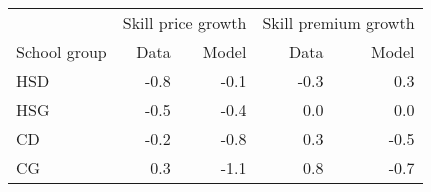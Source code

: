 \begin{tabular}{l|rr|rr}
\hline
 & \multicolumn{2}{|c|}{Skill price growth}  &  \multicolumn{2}{|c}{Skill premium growth} \\ 
School group & Data  & Model  & Data  & Model  \\ 
\hline
HSD & -0.8  & -0.1  & -0.3  &  0.3  \\ 
HSG & -0.5  & -0.4  &  0.0  &  0.0  \\ 
CD & -0.2  & -0.8  &  0.3  & -0.5  \\ 
CG &  0.3  & -1.1  &  0.8  & -0.7  \\ 
\hline
\end{tabular}%
